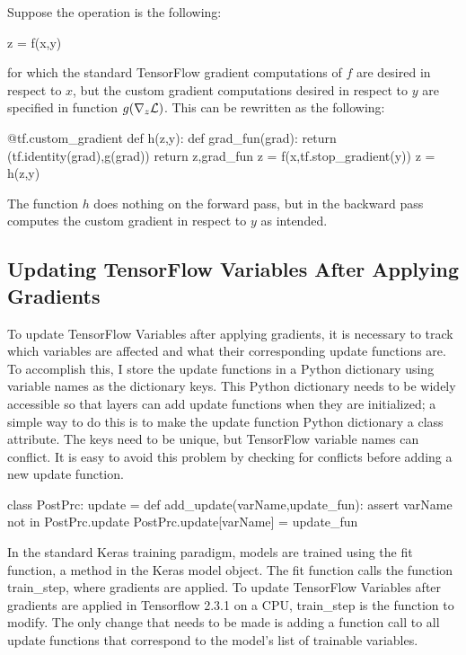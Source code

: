 Suppose the operation is the following:


\begin{code}
z = f(x,y)
\end{code}

for which the standard TensorFlow gradient computations of $f$ are desired in respect to $x$, but the custom gradient computations desired in respect to $y$ are specified in function $g(\nabla_z \mathcal{L})$. This can be rewritten as the following:

\begin{code}
@tf.custom_gradient
def h(z,y):
    def grad_fun(grad):
        return (tf.identity(grad),g(grad))
    return z,grad_fun
z = f(x,tf.stop_gradient(y))
z = h(z,y)
\end{code}

The function $h$ does nothing on the forward pass, but in the backward pass computes the custom gradient in respect to $y$ as intended.

\subsection{Updating TensorFlow Variables After Applying Gradients}
To update TensorFlow Variables after applying gradients, it is necessary to track which variables are affected and what their corresponding update functions are. To accomplish this, I store the update functions in a Python dictionary using variable names as the dictionary keys. This Python dictionary needs to be widely accessible so that layers can add update functions when they are initialized; a simple way to do this is to make the update function Python dictionary a class attribute. The keys need to be unique, but TensorFlow variable names can conflict. It is easy to avoid this problem by checking for conflicts before adding a new update function.

\begin{code}
class PostPrc:
    update = {}
    def add_update(varName,update_fun):
        assert varName not in PostPrc.update
        PostPrc.update[varName] = update_fun
\end{code}


In the standard Keras training paradigm, models are trained using the fit function, a method in the Keras model object. The fit function calls the function train\_step, where gradients are applied.  To update TensorFlow Variables after gradients are applied in Tensorflow 2.3.1 on a CPU, train\_step is the function to modify. The only change that needs to be made is adding a function call to all update functions that correspond to the model's list of trainable variables.


